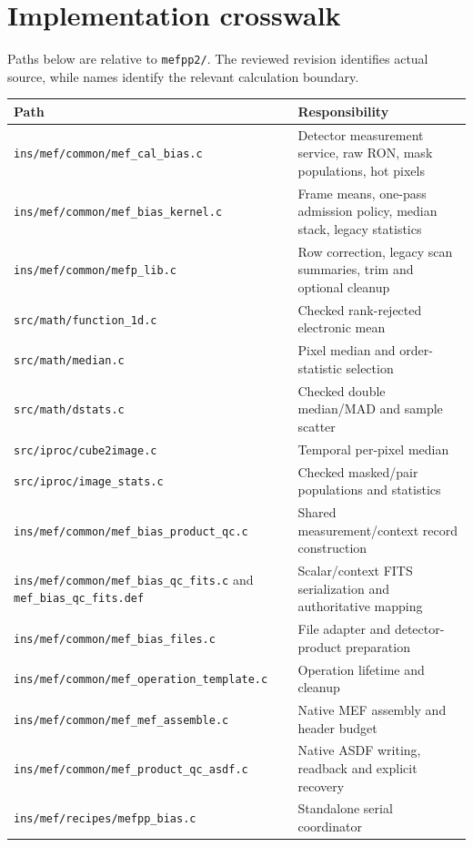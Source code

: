 \documentclass[11pt,a4paper]{article}
\newcommand{\code}[1]{\nolinkurl{#1}}
\begin{document}
\section{Implementation crosswalk}
Paths below are relative to \code{mefpp2/}. The reviewed revision identifies
actual source, while names identify the relevant calculation boundary.
\begin{center}\small
\begin{tabular}{p{71mm}p{65mm}}
\toprule Path & Responsibility \\\midrule
\code{ins/mef/common/mef_cal_bias.c} & Detector measurement service, raw RON, mask populations, hot pixels \\
\code{ins/mef/common/mef_bias_kernel.c} & Frame means, one-pass admission policy, median stack, legacy statistics \\
\code{ins/mef/common/mefp_lib.c} & Row correction, legacy scan summaries, trim and optional cleanup \\
\code{src/math/function_1d.c} & Checked rank-rejected electronic mean \\
\code{src/math/median.c} & Pixel median and order-statistic selection \\
\code{src/math/dstats.c} & Checked double median/MAD and sample scatter \\
\code{src/iproc/cube2image.c} & Temporal per-pixel median \\
\code{src/iproc/image_stats.c} & Checked masked/pair populations and statistics \\
\code{ins/mef/common/mef_bias_product_qc.c} & Shared measurement/context record construction \\
\code{ins/mef/common/mef_bias_qc_fits.c} and \code{mef_bias_qc_fits.def} & Scalar/context FITS serialization and authoritative mapping \\
\code{ins/mef/common/mef_bias_files.c} & File adapter and detector-product preparation \\
\code{ins/mef/common/mef_operation_template.c} & Operation lifetime and cleanup \\
\code{ins/mef/common/mef_mef_assemble.c} & Native MEF assembly and header budget \\
\code{ins/mef/common/mef_product_qc_asdf.c} & Native ASDF writing, readback and explicit recovery \\
\code{ins/mef/recipes/mefpp_bias.c} & Standalone serial coordinator \\
\bottomrule
\end{tabular}\end{center}
\end{document}
